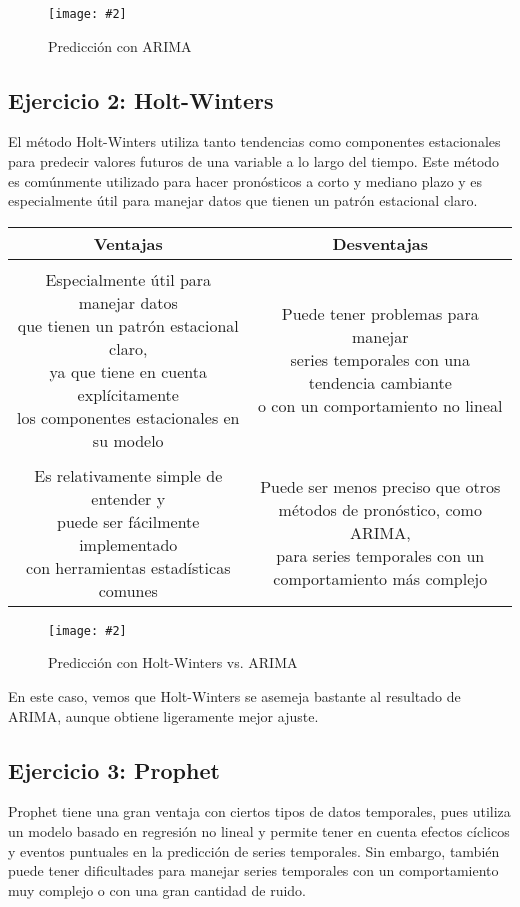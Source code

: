 \documentclass[
12pt, 
spanish, 
singlespacing,
headsepline
]{article}
\newcommand{\image}[2]{
\begin{figure}[H]
	\caption{#1}
	\centering
	\texttt{[image: \#2]}
\end{figure}
}
\begin{document}
\image{Predicción con ARIMA}{PL8/arima.png}

\subsection{Ejercicio 2: Holt-Winters}
El método Holt-Winters utiliza tanto tendencias como componentes estacionales para predecir valores futuros de una variable a lo largo del tiempo. Este método es comúnmente utilizado para hacer pronósticos a corto y mediano plazo y es especialmente útil para manejar datos que tienen un patrón estacional claro.

\begin{center}
\begin{tabular}{|c|c|}
\hline
Ventajas & Desventajas \\
\hline
\\
\shortstack{Especialmente útil para manejar datos \\ que tienen un patrón estacional claro, \\ ya que tiene en cuenta explícitamente \\ los componentes estacionales en su modelo} & \shortstack{Puede tener problemas para manejar \\ series temporales con una tendencia cambiante \\ o con un comportamiento no lineal} \\
\hline
\\
\shortstack{Es relativamente simple de entender y \\ puede ser fácilmente implementado \\ con herramientas estadísticas comunes} & \shortstack{Puede ser menos preciso que otros \\ métodos de pronóstico, como ARIMA, \\ para series temporales con un \\ comportamiento más complejo} \\
\hline
\end{tabular}
\end{center}

\image{Predicción con Holt-Winters vs. ARIMA}{PL8/holt.png}

En este caso, vemos que Holt-Winters se asemeja bastante al resultado de ARIMA, aunque obtiene ligeramente mejor ajuste.

\subsection{Ejercicio 3: Prophet}
Prophet tiene una gran ventaja con ciertos tipos de datos temporales, pues utiliza un modelo basado en regresión no lineal y permite tener en cuenta efectos cíclicos y eventos puntuales en la predicción de series temporales. Sin embargo, también puede tener dificultades para manejar series temporales con un comportamiento muy complejo o con una gran cantidad de ruido.
\end{document}
